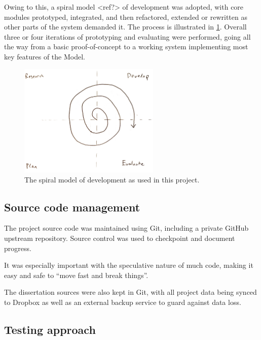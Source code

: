 Owing to this, a spiral model <ref?> of development was adopted, with core modules prototyped, integrated, and then refactored, extended or rewritten as other parts of the system demanded it.
The process is illustrated in \cref{fig:prep:spiral-model}.
Overall three or four iterations of prototyping and evaluating were performed, going all the way from a basic proof-of-concept to a working system implementing most key features of the Model.

\begin{figure}[h]
	\centering
	\includegraphics[width=0.6\textwidth]{images/temp/spiral}
	\caption{The spiral model of development as used in this project.}
	\label{fig:prep:spiral-model}
\end{figure}



\subsection{Source code management}\label{sec:prep:softeng:scm}

The project source code was maintained using Git, including a private GitHub upstream repository.
Source control was used to checkpoint and document progress.

It was especially important with the speculative nature of much code, making it easy and safe to ``move fast and break things''.

The dissertation sources were also kept in Git, with all project data being synced to Dropbox as well as an external backup service to guard against data loss.

\subsection{Testing approach}\label{sec:prep:softeng:testing}

